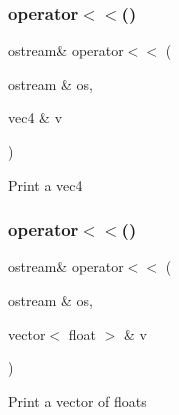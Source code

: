 \subsubsection{\texorpdfstring{operator$<$$<$()}{operator<<()}\hspace{0.1cm}{\footnotesize\ttfamily [3/4]}}
{\footnotesize\ttfamily ostream\& operator$<$$<$ (\begin{DoxyParamCaption}\item[{ostream \&}]{os,  }\item[{vec4 \&}]{v }\end{DoxyParamCaption})}

Print a vec4 \mbox{\label{cout-definitions_8hpp_a337249c538c5d8304a68a31ecc936c81}} 
\subsubsection{\texorpdfstring{operator$<$$<$()}{operator<<()}\hspace{0.1cm}{\footnotesize\ttfamily [4/4]}}
{\footnotesize\ttfamily ostream\& operator$<$$<$ (\begin{DoxyParamCaption}\item[{ostream \&}]{os,  }\item[{vector$<$ float $>$ \&}]{v }\end{DoxyParamCaption})}

Print a vector of floats 